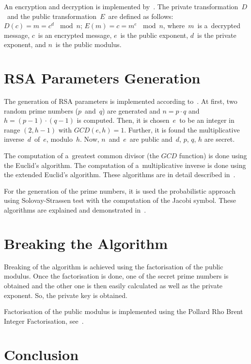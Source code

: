 \documentclass[a4paper, 10pt, twocolumn]{article}
\begin{document}
    An encryption and decryption is implemented by~\cite{pkcrypt}. The
    private transformation~$ D $~and the public transformation~$ E $~are
    defined as follows: $ D(c) = m = c^d\,\mod n $; $ E(m) = c = m^e\,\mod
    n $, where~$ m $~is a~decrypted message, $ c $~is an encrypted message,
    $ e $~is the public exponent, $ d $~is the private exponent, and
    $ n $~is the public modulus.


    \section{RSA Parameters Generation}

    The generation of RSA parameters is implemented according
    to~\cite{pkcrypt}. At first, two random prime numbers ($ p $~and~$ q $)
    are generated and $ n = p \cdot q $ and $ h = (p - 1) \cdot (q - 1) $ is
    computed. Then, it is chosen~$ e $~to be an integer in range
    $ (2, h - 1) $ with $ GCD(e, h) = 1 $. Further, it is found the
    multiplicative inverse~$ d $~of~$ e $, modulo~$ h $. Now, $ n $~and~$ e
    $~are public and~$ d $, $ p $, $ q $, $ h $ are secret.

    The computation of a~greatest common divisor (the $ GCD $ function)
    is done using the Euclid's algorithm. The computation of a~multiplicative
    inverse is done using the extended Euclid's algorithm. These algorithms
    are in detail described in~\cite{pkcrypt}.

    For the generation of the prime numbers, it is used the probabilistic
    approach using Solovay-Strassen test with the computation of the
    Jacobi symbol. These algorithms are explained and demonstrated
    in~\cite{pkcrypt, solovay, jacobi}.


    \section{Breaking the Algorithm}

    Breaking of the algorithm is achieved using the factorisation of the
    public modulus. Once the factorisation is done, one of the secret
    prime numbers is obtained and the other one is then easily calculated
    as well as the private exponent. So, the private key is obtained.

    Factorisation of the public modulus is implemented using the
    Pollard Rho Brent Integer Factorisation, see~\cite{brent, brentOnline}.


    \section{Conclusion}
\end{document}
